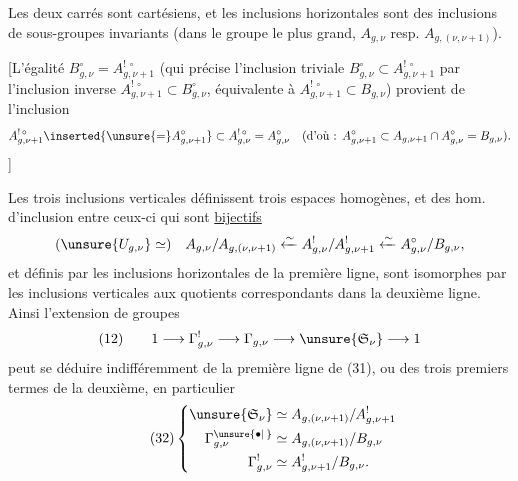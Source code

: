 Les deux carrés sont cartésiens, et les inclusions horizontales  sont des inclusions de sous-groupes invariants  (dans le groupe le plus grand, $A_{g,\nu}$ resp. $A_{g,(\nu,\nu+1)}$).

[L'égalité $B_{g,\nu}^{\circ}=A_{g,\nu+1}^{!\,\circ}$  (qui précise l'inclusion triviale $B_{g,\nu}^{\circ}\subset A_{g,\nu+1}^{!\,\circ}$ par l'inclusion inverse $A_{g,\nu+1}^{!\,\circ}\subset B_{g,\nu}^{\circ}$, équivalente à $A_{g,\nu+1}^{!\,\circ}\subset B_{g,\nu}$) provient de l'inclusion
\[
A_{g,\nu+1}^{!\,\circ}\inserted{\unsure{=}A_{g,\nu+1}^{\circ}}\subset A_{g,\nu}^{!\,\circ}=A_{g,\nu}^{\circ}
\quad\text{(d'où : }A_{g,\nu+1}^{\circ}\subset A_{g,\nu+1}\cap A_{g,\nu}^{\circ}=B_{g,\nu}\text{).}
\]
]

Les trois inclusions verticales définissent trois espaces homogènes, et  des hom. d'inclusion entre ceux-ci qui sont \uline{bijectifs}
\[
(\unsure{U_{g,\nu}}\simeq)\quad
A_{g,\nu}/A_{g,(\nu,\nu+1)}
\xleftarrow{\sim} A_{g,\nu}^{!}/A_{g,\nu+1}^{!}
\xleftarrow{\sim} A_{g,\nu}^{\circ}/B_{g,\nu},
\]
et    définis par les inclusions horizontales de la première ligne, sont isomorphes par les inclusions verticales aux quotients correspondants dans la deuxième ligne. Ainsi l'extension de groupes
\[
(12)\qquad 1\longrightarrow\Gamma_{g,\nu}^{!}\longrightarrow\Gamma_{g,\nu}\longrightarrow\unsure{\mathfrak S_\nu}\longrightarrow1
\]
peut  se déduire indifféremment de
la première ligne de (31), ou des trois premiers termes de la deuxième, en particulier
\[
\tag{32}
\left\{\begin{aligned}
\unsure{\mathfrak S_\nu}&\simeq A_{g,(\nu,\nu+1)}/A_{g,\nu+1}^{!}\\
\Gamma_{g,\nu}^{\unsure{\bullet|\,}}&\simeq A_{g,(\nu,\nu+1)}/B_{g,\nu}\\
\Gamma_{g,\nu}^{!}&\simeq A_{g,\nu+1}^{!}/B_{g,\nu}.
\end{aligned}\right.
\]

